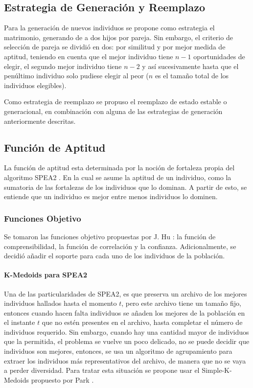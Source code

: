 \documentclass{llncs}
\begin{document}
\subsection{Estrategia de Generación y Reemplazo}
Para la generación de nuevos individuos se propone como estrategia el matrimonio, generando de a dos hijos por pareja. Sin embargo, el criterio de selección de pareja se dividió en dos: por similitud y por mejor medida de aptitud, teniendo en cuenta que el mejor individuo tiene $n-1$ oportunidades de elegir, el segundo mejor individuo tiene $n-2$ y así sucesivamente hasta que el penúltimo individuo solo pudiese elegir al peor ($n$ es el tamaño total de los individuos elegibles).

Como estrategia de reemplazo se propuso el reemplazo de estado estable o generacional, en combinación con alguna de las estrategias de generación anteriormente descritas.

\subsection{Función de Aptitud}
La función de aptitud esta determinada por la noción de fortaleza propia del algoritmo SPEA2 \cite{zitzler:laumans:thiele}.
En la cual se asume la aptitud de un individuo, como la sumatoria de las fortalezas de los individuos que lo dominan.
A partir de esto, se entiende que un individuo es mejor entre menos individuos lo dominen.
\subsubsection{Funciones Objetivo}
Se tomaron las funciones objetivo propuestas por J. Hu \cite{hu}: la función de comprensibilidad, la función de correlación y la confianza. Adicionalmente, se decidió añadir el soporte para cada uno de los individuos de la población.
\paragraph{K-Medoids para SPEA2}
Una de las particularidades de SPEA2, es que preserva un archivo de los mejores individuos hallados hasta el momento $t$, pero este archivo tiene un tamaño fijo, entonces cuando hacen falta individuos se añaden los mejores de la población en el instante $t$ que no estén presentes en el archivo, hasta completar el número de individuos requerido. Sin embargo, cuando hay una cantidad mayor de individuos que la permitida, el problema se vuelve un poco delicado, no se puede decidir que individuos son mejores, entonces, se usa un algoritmo de agrupamiento para extraer los individuos más representativos del archivo, de manera que no se vaya a perder diversidad. Para tratar esta situación se propone usar el Simple-K-Medoids propuesto por Park \cite{Park}.
\end{document}
